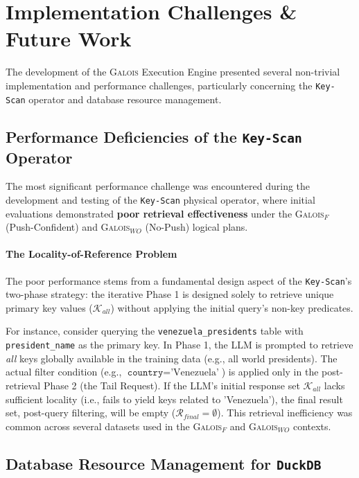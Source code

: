 \section{Implementation Challenges \& Future Work}

The development of the \textsc{Galois} Execution Engine presented several non-trivial implementation and performance challenges, particularly concerning the \texttt{Key-Scan} operator and database resource management.

\subsection{Performance Deficiencies of the \texttt{Key-Scan} Operator}

The most significant performance challenge was encountered during the development and testing of the \texttt{Key-Scan} physical operator, where initial evaluations demonstrated \textbf{poor retrieval effectiveness} under the \textsc{Galois}$_{F}$ (Push-Confident) and \textsc{Galois}$_{WO}$ (No-Push) logical plans.

\paragraph{The Locality-of-Reference Problem}
The poor performance stems from a fundamental design aspect of the \texttt{Key-Scan}'s two-phase strategy: the iterative Phase 1 is designed solely to retrieve unique primary key values ($\mathcal{K}_{all}$) without applying the initial query's non-key predicates.

For instance, consider querying the \texttt{venezuela\_presidents} table with \texttt{president\_name} as the primary key. In Phase 1, the LLM is prompted to retrieve \textit{all} keys globally available in the training data (e.g., all world presidents). The actual filter condition (e.g., $\texttt{country} = \text{'Venezuela'}$) is applied only in the post-retrieval Phase 2 (the Tail Request). If the LLM's initial response set $\mathcal{K}_{all}$ lacks sufficient locality (i.e., fails to yield keys related to 'Venezuela'), the final result set, post-query filtering, will be empty ($\mathcal{R}_{final} = \emptyset$). This retrieval inefficiency was common across several datasets used in the \textsc{Galois}$_{F}$ and \textsc{Galois}$_{WO}$ contexts.

\subsection{Database Resource Management for \texttt{DuckDB}}

